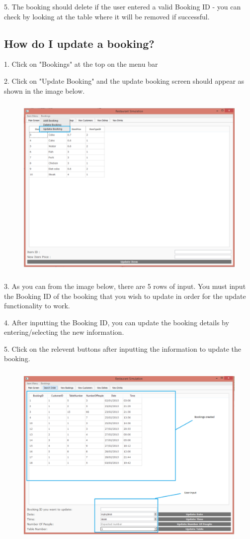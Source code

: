 5. The booking should delete if the user entered a valid Booking ID - you can check by looking at the table where it will be removed if successful.

\newpage
\subsection{How do I update a booking?}

1. Click on "Bookings" at the top on the menu bar

2. Click on "Update Booking" and the update booking screen should appear as shown in the image below. 

\begin{figure}[H]
    \includegraphics[height = 9cm]{./Manual/images/UpdateBooking1} 
    \caption{} \label{fig:updatebooking1}
\end{figure}

3. As you can from the image below, there are 5 rows of input. You must input the Booking ID of the booking that you wish to update in order for the update functionality to work. 

4. After inputting the Booking ID, you can update the booking details by entering/selecting the new information.

5. Click on the relevent buttons after inputting the information to update the booking.

\begin{figure}[H]
    \includegraphics[height = 9cm]{./Manual/images/UpdateBooking2} 
    \caption{} \label{fig:updatebooking2}
\end{figure}

